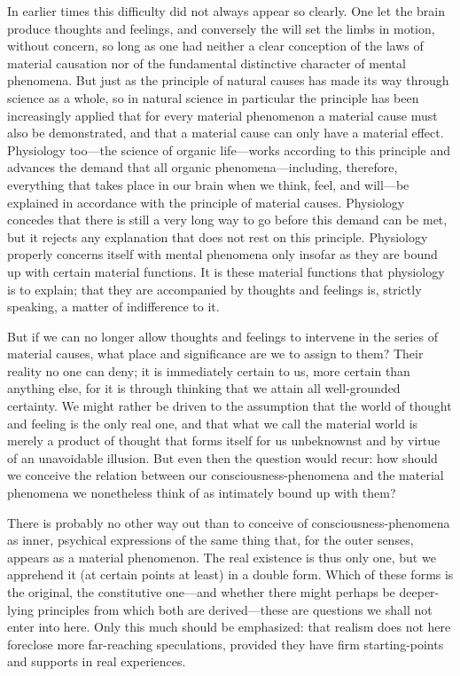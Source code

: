 \documentclass[12pt,a4paper]{article}
\begin{document}
In earlier times this difficulty did not always appear so clearly. One
let the brain produce thoughts and feelings, and conversely the will set
the limbs in motion, without concern, so long as one had neither a clear
conception of the laws of material causation nor of the fundamental
distinctive character of mental phenomena. But just as the principle of
natural causes has made its way through science as a whole, so in natural
science in particular the principle has been increasingly applied that for
every material phenomenon a material cause must also be demonstrated, and
that a material cause can only have a material effect. Physiology too---the
science of organic life---works according to this principle and advances
the demand that all organic phenomena---including, therefore, everything
that takes place in our brain when we think, feel, and will---be explained
in accordance with the principle of material causes. Physiology concedes
that there is still a very long way to go before this demand can be met,
but it rejects any explanation that does not rest on this principle.
Physiology properly concerns itself with mental phenomena only insofar as
they are bound up with certain material functions. It is these material
functions that physiology is to explain; that they are accompanied by
thoughts and feelings is, strictly speaking, a matter of indifference
to it.

But if we can no longer allow thoughts and feelings to intervene in the
series of material causes, what place and significance are we to assign
to them? Their reality no one can deny; it is immediately certain to us,
more certain than anything else, for it is through thinking that we attain
all well-grounded certainty. We might rather be driven to the assumption
that the world of thought and feeling is the only real one, and that what
we call the material world is merely a product of thought that forms
itself for us unbeknownst and by virtue of an unavoidable illusion. But
even then the question would recur: how should we conceive the relation
between our consciousness-phenomena and the material phenomena we
nonetheless think of as intimately bound up with them?

There is probably no other way out than to conceive of
consciousness-phenomena as inner, psychical expressions of the same thing
that, for the outer senses, appears as a material phenomenon. The real
existence is thus only one, but we apprehend it (at certain points at
least) in a double form. Which of these forms is the original, the
constitutive one---and whether there might perhaps be deeper-lying
principles from which both are derived---these are questions we shall not
enter into here. Only this much should be emphasized: that realism does
not here foreclose more far-reaching speculations, provided they have firm
starting-points and supports in real experiences.
\end{document}
